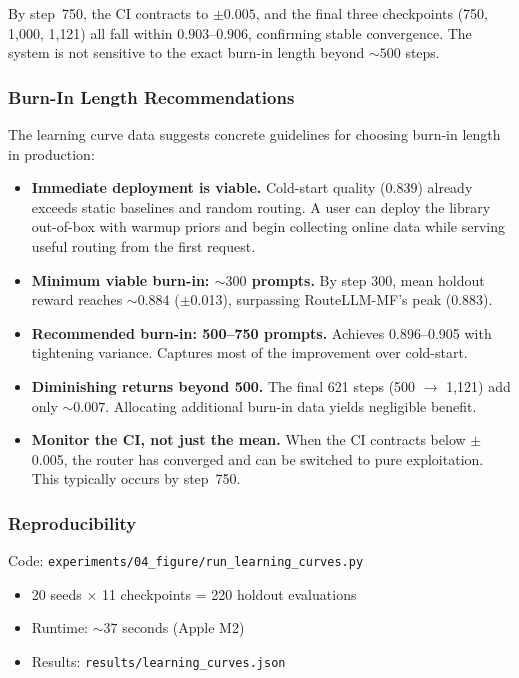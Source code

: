 By step~750, the CI contracts to $\pm 0.005$, and the final three
checkpoints (750, 1{,}000, 1{,}121) all fall within $0.903$--$0.906$,
confirming stable convergence.  The system is not sensitive to the exact
burn-in length beyond ${\sim}500$ steps.

\subsubsection{Burn-In Length Recommendations}

The learning curve data suggests concrete guidelines for choosing burn-in
length in production:

\begin{itemize}[leftmargin=*,noitemsep]
    \item \textbf{Immediate deployment is viable.}  Cold-start quality
          ($0.839$) already exceeds static baselines and random routing.
          A user can deploy the library out-of-box with warmup priors and
          begin collecting online data while serving useful routing from
          the first request.
    \item \textbf{Minimum viable burn-in: ${\sim}300$ prompts.}  By step
          300, mean holdout reward reaches ${\sim}0.884$
          ($\pm$0.013), surpassing RouteLLM-MF's peak (0.883).
    \item \textbf{Recommended burn-in: 500--750 prompts.}  Achieves
          0.896--0.905 with tightening variance.  Captures most of the
          improvement over cold-start.
    \item \textbf{Diminishing returns beyond 500.}  The final 621 steps
          (500 $\to$ 1,121) add only ${\sim}0.007$.  Allocating
          additional burn-in data yields negligible benefit.
    \item \textbf{Monitor the CI, not just the mean.}  When the CI
          contracts below $\pm$0.005, the router has converged and can
          be switched to pure exploitation.  This typically occurs by
          step~750.
\end{itemize}

\subsubsection{Reproducibility}

Code: \texttt{experiments/04\_figure/run\_learning\_curves.py}

\begin{itemize}[noitemsep]
    \item 20 seeds $\times$ 11 checkpoints = 220 holdout evaluations
    \item Runtime: ${\sim}37$ seconds (Apple M2)
    \item Results: \texttt{results/learning\_curves.json}
\end{itemize}
